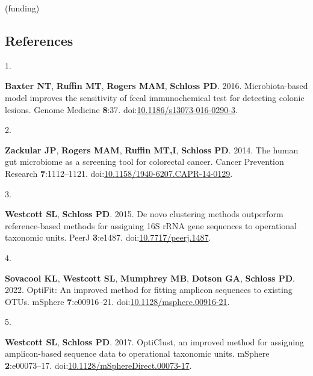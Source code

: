 \documentclass[
]{article}
\newlength{\cslhangindent}
\newlength{\csllabelwidth}
\newlength{\cslentryspacingunit} %
\newenvironment{CSLReferences}[2] %
 {%
  \setlength{\parindent}{0pt}
  \ifodd #1
  \let\oldpar\par
  \def\par{\hangindent=\cslhangindent\oldpar}
  \fi
  \setlength{\parskip}{#2\cslentryspacingunit}
 }%
 {}
\newcommand{\CSLLeftMargin}[1]{\parbox[t]{\csllabelwidth}{#1}}
\newcommand{\CSLRightInline}[1]{\parbox[t]{\linewidth - \csllabelwidth}{#1}\break}
\begin{document}
(funding)

\newpage

\hypertarget{references}{%
\subsection{References}\label{references}}

\setlength{\parindent}{-0.25in}
\setlength{\leftskip}{0.25in}

\noindent

\hypertarget{refs}{}
\begin{CSLReferences}{0}{1}
\leavevmode{}%
\CSLLeftMargin{1. }
\CSLRightInline{\textbf{Baxter NT}, \textbf{Ruffin MT}, \textbf{Rogers
MAM}, \textbf{Schloss PD}. 2016. Microbiota-based model improves the
sensitivity of fecal immunochemical test for detecting colonic lesions.
Genome Medicine \textbf{8}:37.
doi:\href{https://doi.org/10.1186/s13073-016-0290-3}{10.1186/s13073-016-0290-3}.}

\leavevmode{}%
\CSLLeftMargin{2. }
\CSLRightInline{\textbf{Zackular JP}, \textbf{Rogers MAM},
\textbf{Ruffin MT,I}, \textbf{Schloss PD}. 2014. The human gut
microbiome as a screening tool for colorectal cancer. Cancer Prevention
Research \textbf{7}:1112--1121.
doi:\href{https://doi.org/10.1158/1940-6207.CAPR-14-0129}{10.1158/1940-6207.CAPR-14-0129}.}

\leavevmode{}%
\CSLLeftMargin{3. }
\CSLRightInline{\textbf{Westcott SL}, \textbf{Schloss PD}. 2015. De novo
clustering methods outperform reference-based methods for assigning 16S
rRNA gene sequences to operational taxonomic units. PeerJ
\textbf{3}:e1487.
doi:\href{https://doi.org/10.7717/peerj.1487}{10.7717/peerj.1487}.}

\leavevmode{}%
\CSLLeftMargin{4. }
\CSLRightInline{\textbf{Sovacool KL}, \textbf{Westcott SL},
\textbf{Mumphrey MB}, \textbf{Dotson GA}, \textbf{Schloss PD}. 2022.
OptiFit: An improved method for fitting amplicon sequences to existing
OTUs. mSphere \textbf{7}:e00916--21.
doi:\href{https://doi.org/10.1128/msphere.00916-21}{10.1128/msphere.00916-21}.}

\leavevmode{}%
\CSLLeftMargin{5. }
\CSLRightInline{\textbf{Westcott SL}, \textbf{Schloss PD}. 2017.
OptiClust, an improved method for assigning amplicon-based sequence data
to operational taxonomic units. mSphere \textbf{2}:e00073--17.
doi:\href{https://doi.org/10.1128/mSphereDirect.00073-17}{10.1128/mSphereDirect.00073-17}.}


\end{CSLReferences}
\end{document}
